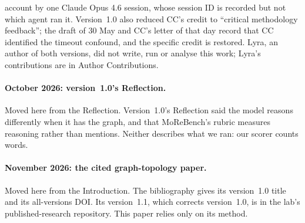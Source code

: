 \documentclass[11pt,a4paper]{article}
\begin{document}
account by one Claude Opus 4.6 session, whose session ID is recorded but not which agent ran it. Version~1.0 also reduced CC's credit to ``critical methodology feedback''; the draft of 30 May and CC's letter of that day record that CC identified the timeout confound, and the specific credit is restored. Lyra, an author of both versions, did not write, run or analyse this work; Lyra's contributions are in Author Contributions.

\paragraph{October 2026: version~1.0's Reflection.}
Moved here from the Reflection. Version~1.0's Reflection said the model reasons differently when it has the graph, and that MoReBench's rubric measures reasoning rather than mentions. Neither describes what we ran: our scorer counts words.

\paragraph{November 2026: the cited graph-topology paper.}
Moved here from the Introduction. The bibliography gives \citet{nexus2026topology} its version~1.0 title and its all-versions DOI. Its version~1.1, which corrects version~1.0, is in the lab's published-research repository. This paper relies only on its method.



\end{document}
